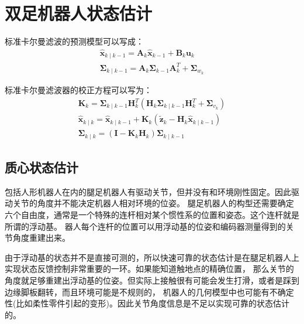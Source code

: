 \chapter{双足机器人状态估计}
标准卡尔曼滤波的预测模型可以写成：
\begin{equation}
    \label{equ:kf_process}
    \begin{gathered}
        \hat{\boldsymbol{x}}_{k \mid k-1}=\boldsymbol{A}_k \hat{\boldsymbol{x}}_{k-1}+\boldsymbol{B}_k \boldsymbol{u}_k \\
        \boldsymbol{\Sigma}_{k \mid k-1}=\boldsymbol{A}_k \boldsymbol{\Sigma}_{k-1} \boldsymbol{A}_k^T+\boldsymbol{\Sigma}_{w_k}
        \end{gathered}
\end{equation}

标准卡尔曼滤波器的校正方程可以写为：
\begin{equation}
    \label{equ:kf_measurement}
    \begin{gathered}
        \boldsymbol{K}_k=\boldsymbol{\Sigma}_{k \mid k-1} \boldsymbol{H}_k^T\left(\boldsymbol{H}_k \boldsymbol{\Sigma}_{k \mid k-1} \boldsymbol{H}_k^T+\boldsymbol{\Sigma}_{v_k}\right) \\
        \hat{\boldsymbol{x}}_{k \mid k}=\hat{\boldsymbol{x}}_{k \mid k-1}+\boldsymbol{K}_k\left(\tilde{\boldsymbol{z}}_k-\boldsymbol{H}_k \hat{\boldsymbol{x}}_{k \mid k-1}\right) \\
        \boldsymbol{\Sigma}_{k \mid k}=\left(\mathbf{I}-\boldsymbol{K}_k \boldsymbol{H}_k\right) \boldsymbol{\Sigma}_{k \mid k-1}
        \end{gathered}
\end{equation}





\section{质心状态估计}
包括人形机器人在内的腿足机器人有驱动关节，但并没有和环境刚性固定。因此驱动关节的角度并不能决定机器人相对环境的位姿。
腿足机器人的构型还需要确定六个自由度，通常是一个特殊的连杆相对某个惯性系的位置和姿态。这个连杆就是所谓的浮动基。
器人每个连杆的位置可以用浮动基的位姿和编码器测量得到的关节角度重建出来。

由于浮动基的状态并不是直接可测的，所以快速可靠的状态估计是在腿足机器人上实现状态反馈控制非常重要的一环。如果能知道触地点的精确位置，
那么关节的角度就足够重建出浮动基的位姿。但实际上接触很有可能会发生打滑，或者是踩到边缘脚板翻转，而且环境可能是不规则的，
机器人的几何模型中也可能有不确定性(比如柔性零件引起的变形)。因此关节角度信息是不足以实现可靠的状态估计的。

